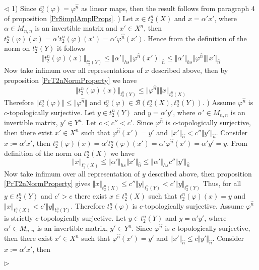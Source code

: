 \documentclass[12pt]{article}
\newenvironment{proof}{\par $\triangleleft$}{$\triangleright$}
\begin{document}
\begin{proof}
1) Since $t_2^n(\varphi)=\varphi^{\wideparen{n}}$ as linear maps, then the result follows from paragraph 4 of proposition \ref{PrSimplAmplProps}. 
) Let $x\in t_2^n(X)$ and $x=\alpha'x'$, where $\alpha\in M_{n,n}$ is an invertible matrix and $x'\in X^{n}$, then $t_2^n(\varphi)(x)=\alpha't_2^n(\varphi)(x')=\alpha'\varphi^{\wideparen{n}}(x')$. Hence from the definition of the norm on $t_2^n(Y)$ it follows
$$
\Vert t_2^n(\varphi)(x)\Vert_{t_2^n(Y)}
\leq\Vert\alpha'\Vert_{hs}\Vert\varphi^{\wideparen{n}}(x')\Vert_{\wideparen{n}}
\leq\Vert\alpha'\Vert_{hs}\Vert\varphi^{\wideparen{n}}\Vert\Vert x'\vert_{\wideparen{n}}
$$
Now take infimum over all representations of $x$ described above, then by proposition \ref{PrT2nNormProperty} we have
$$
\Vert t_2^n(\varphi)(x)\Vert_{t_2^n(Y)}\leq\Vert\varphi^{\wideparen{n}}\Vert\Vert x\Vert_{t_2^n(X)}
$$
Therefore $\Vert t_2^n(\varphi)\Vert\leq\Vert\varphi^{\wideparen{n}}\Vert$ and $t_2^n(\varphi)\in\mathcal{B}(t_2^n(X),t_2^n(Y))$.
) Assume $\varphi^{\wideparen{n}}$ is $c$-topologically surjective. Let $y\in t_2^n(Y)$ and $y=\alpha' y'$, where $\alpha'\in M_{n,n}$ is an invertible matrix, $y'\in Y^n$. Let $c<c''<c'$. Since $\varphi^{\wideparen{n}}$ is $c$-topologically surjective, then there exist $x'\in X^n$ such that $\varphi^{\wideparen{n}}(x')=y'$ and $\Vert x'\Vert_{\wideparen{n}}< c''\Vert y'\Vert_{\wideparen{n}}$. Consider 
$x:=\alpha'x'$, then $t_2^n(\varphi)(x)=\alpha't_2^n(\varphi)(x')=\alpha'\varphi^{\wideparen{n}}(x')=\alpha' y'=y$. From definition of the norm on $t_2^n(X)$ we have
$$
\Vert x\Vert_{t_2^n(X)}
\leq\Vert\alpha'\Vert_{hs}\Vert x'\Vert_{\wideparen{n}}
\leq\Vert\alpha'\Vert_{hs} c''\Vert y'\Vert_{\wideparen{n}}
$$
Now take infimum over all representation of $y$ described above, then proposition \ref{PrT2nNormProperty} gives $\Vert x\Vert_{t_2^n(X)}\leq c''\Vert y\Vert_{t_2^n(Y)}<c'\Vert y\Vert_{t_2^n(Y)}$
Thus, for all $y\in t_2^n(Y)$ and $c'>c$ there exist $x\in t_2^n(X)$ such that $t_2^n(\varphi)(x)=y$ and $\Vert x\Vert_{t_2^n(X)}< c'\Vert y\Vert_{t_2^n(Y)}$. Therefore $t_2^n(\varphi)$ is 
$c$-topologically surjective.
\newline
Assume $\varphi^{\wideparen{n}}$ is strictly $c$-topologically surjective. Let $y\in t_2^n(Y)$ and $y=\alpha' y'$, where $\alpha'\in M_{n,n}$ is an invertible matrix, $y'\in Y^n$. Since $\varphi^{\wideparen{n}}$ is  $c$-topologically surjective, then there exist $x'\in X^n$ such that $\varphi^{\wideparen{n}}(x')=y'$ and $\Vert x'\Vert_{\wideparen{n}}\leq c\Vert y'\Vert_{\wideparen{n}}$. Consider $x:=\alpha'x'$, then 

\end{proof}
\end{document}
